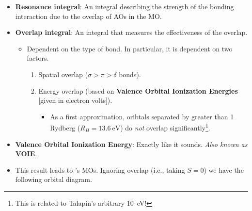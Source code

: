 \documentclass[../notes.tex]{subfiles}
\begin{document}
\begin{itemize}
    \item \textbf{Resonance integral}: An integral describing the strength of the bonding interaction due to the overlap of AOs in the MO.
    \item \textbf{Overlap integral}: An integral that measures the effectiveness of the overlap.
    \begin{itemize}
        \item Dependent on the type of bond. In particular, it is dependent on two factors.
        \begin{enumerate}
            \item Spatial overlap ($\sigma>\pi>\delta$ bonds).
            \item Energy overlap (based on \textbf{Valence Orbital Ionization Energies} [given in electron volts]).
            \begin{itemize}
                \item As a first approximation, oribtals separated by greater than 1 Rydberg ($R_H=\SI{13.6}{\electronvolt}$) do \emph{not} overlap significantly\footnote{This is related to Talapin's arbitrary \SI{10}{\electronvolt}!}.
            \end{itemize}
        \end{enumerate}
    \end{itemize}
    \item \textbf{Valence Orbital Ionization Energy}: Exactly like it sounds. \emph{Also known as} \textbf{VOIE}.
    \item This result leads to 's MOs. Ignoring overlap (i.e., taking $S=0$) we have the following orbital diagram.
    \begin{figure}[h!]
        \centering
        \footnotesize
\end{figure}
\end{itemize}
\end{document}

